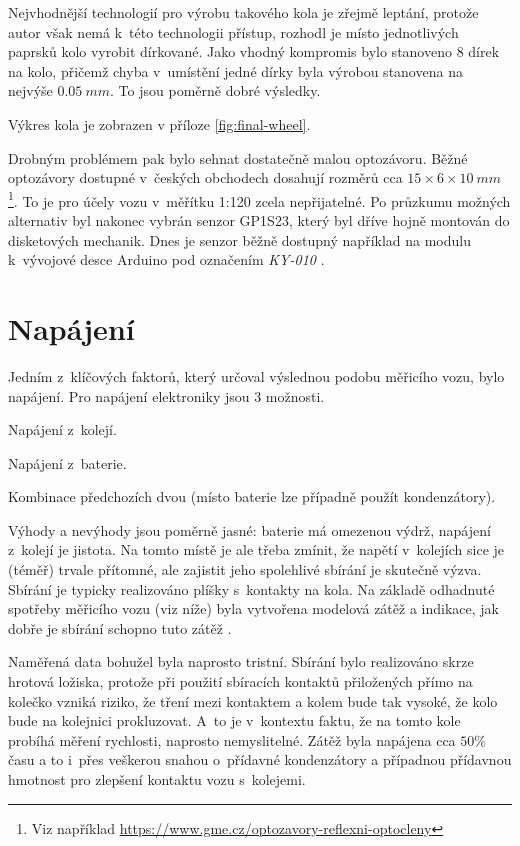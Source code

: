 Nejvhodnější technologií pro výrobu takového kola je zřejmě leptání, protože
autor však nemá k~této technologii přístup, rozhodl je místo jednotlivých
paprsků kolo vyrobit dírkované. Jako vhodný kompromis bylo stanoveno
8 dírek na kolo, přičemž chyba v~umístění jedné dírky byla výrobou stanovena na
nejvýše $0.05\ mm$. To jsou poměrně dobré výsledky.

Výkres kola je zobrazen v příloze \ref{fig:final-wheel}.

Drobným problémem pak bylo sehnat dostatečně malou optozávoru. Běžné optozávory
dostupné v~českých obchodech dosahují rozměrů cca $15\times6\times10\ mm$
\footnote{Viz například
\url{https://www.gme.cz/optozavory-reflexni-optocleny}}. To je pro účely vozu
v~měřítku 1:120 zcela nepřijatelné. Po
průzkumu možných alternativ byl nakonec vybrán senzor
GP1S23\cite{gp1s23:datasheet}, který byl dříve hojně montován do disketových
mechanik. Dnes je senzor běžně dostupný například na modulu k~vývojové desce
Arduino pod označením \textit{KY-010} \cite{ky-010}.

\section{Napájení}
\label{sec:wsm-napajeni}

Jedním z~klíčových faktorů, který určoval výslednou podobu měřicího vozu, bylo
napájení. Pro napájení elektroniky jsou 3 možnosti.

\begin{compactenum}
\item Napájení z~kolejí.
\item Napájení z~baterie.
\item Kombinace předchozích dvou (místo baterie lze případně použít kondenzátory).
\end{compactenum}

Výhody a nevýhody jsou poměrně jasné: baterie má omezenou výdrž, napájení
z~kolejí je jistota. Na tomto místě je ale třeba zmínit, že napětí v~kolejích
sice je (téměř) trvale přítomné, ale zajistit jeho spolehlivé sbírání je
skutečně výzva. Sbírání je typicky realizováno plíšky s~kontakty na kola.
Na základě odhadnuté spotřeby měřicího vozu (viz níže) byla vytvořena modelová
zátěž a indikace, jak dobře je sbírání schopno tuto zátěž .

Naměřená data bohužel byla naprosto tristní. Sbírání bylo realizováno skrze
hrotová ložiska, protože při použití sbíracích kontaktů přiložených přímo na
kolečko vzniká riziko, že tření mezi kontaktem a kolem bude tak vysoké, že kolo
bude na kolejnici prokluzovat. A~to je v~kontextu faktu, že na tomto kole
probíhá měření rychlosti, naprosto nemyslitelné. Zátěž byla napájena cca $50 \%$
času a to i~přes veškerou snahou o~přídavné kondenzátory a případnou přídavnou
hmotnost pro zlepšení kontaktu vozu s~kolejemi.

